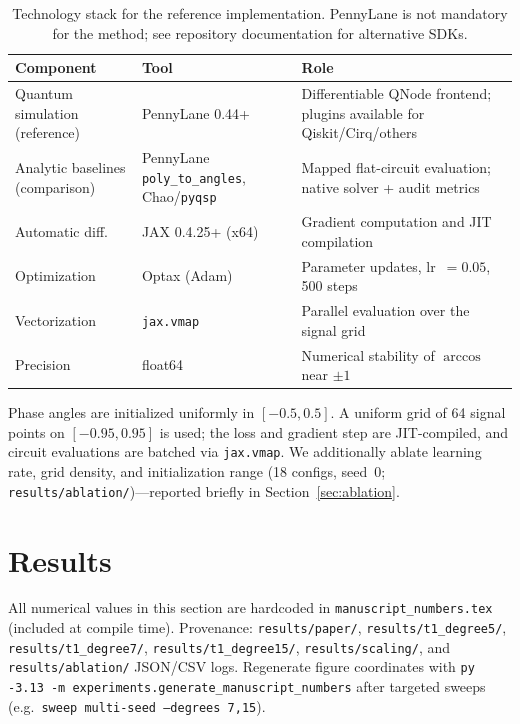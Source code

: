 \documentclass[11pt,a4paper]{article}
\begin{document}
\begin{table}[ht]
\centering\small
\begin{tabularx}{\textwidth}{@{} l l X @{}}
  \toprule
  \textbf{Component} & \textbf{Tool} & \textbf{Role} \\
  \midrule
  Quantum simulation (reference) & PennyLane 0.44+   & Differentiable QNode frontend; plugins available for Qiskit/Cirq/others \\
  Analytic baselines (comparison) & PennyLane \texttt{poly\_to\_angles}, Chao/\texttt{pyqsp} & Mapped flat-circuit evaluation; native solver + audit metrics \\
  Automatic diff.     & JAX 0.4.25+ (x64) & Gradient computation and JIT compilation \\
  Optimization        & Optax (Adam)       & Parameter updates, lr~$=0.05$, 500 steps \\
  Vectorization       & \texttt{jax.vmap} & Parallel evaluation over the signal grid \\
  Precision           & float64            & Numerical stability of $\arccos$ near $\pm 1$ \\
  \bottomrule
\end{tabularx}
\caption{Technology stack for the reference implementation. PennyLane is not mandatory for the method; see repository documentation for alternative SDKs.}
\label{tab:stack}
\end{table}

Phase angles are initialized uniformly in $[-0.5,0.5]$. A uniform grid of 64 signal points on $[-0.95,0.95]$ is used; the loss and gradient step are JIT-compiled, and circuit evaluations are batched via \texttt{jax.vmap}. We additionally ablate learning rate, grid density, and initialization range (18 configs, seed~0; \texttt{results/ablation/})---reported briefly in Section~\ref{sec:ablation}.

\section{Results}

All numerical values in this section are hardcoded in \texttt{manuscript\_numbers.tex} (included at compile time). Provenance: \texttt{results/paper/}, \texttt{results/t1\_degree5/}, \texttt{results/t1\_degree7/}, \texttt{results/t1\_degree15/}, \texttt{results/scaling/}, and \texttt{results/ablation/} JSON/CSV logs. Regenerate figure coordinates with \texttt{py -3.13 -m experiments.generate\_manuscript\_numbers} after targeted sweeps (e.g.\ \texttt{sweep multi-seed --degrees 7,15}).
\end{document}
